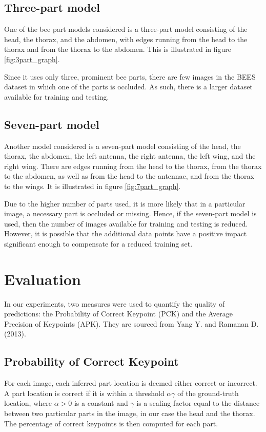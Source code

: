 \documentclass[11pt, oneside]{report}
\begin{document}
    \subsection{Three-part model}
        One of the bee part models considered is a three-part model consisting of the head, the thorax, and the abdomen, with edges running from the head to the thorax and from the thorax to the abdomen. This is illustrated in figure \ref{fig:3part_graph}.

        Since it uses only three, prominent bee parts, there are few images in the BEES dataset in which one of the parts is occluded. As such, there is a larger dataset available for training and testing.

    \subsection{Seven-part model}
        Another model considered is a seven-part model consisting of the head, the thorax, the abdomen, the left antenna, the right antenna, the left wing, and the right wing. There are edges running from the head to the thorax, from the thorax to the abdomen, as well as from the head to the antennae, and from the thorax to the wings. It is illustrated in figure \ref{fig:7part_graph}.

        Due to the higher number of parts used, it is more likely that in a particular image, a necessary part is occluded or missing. Hence, if the seven-part model is used, then the number of images available for training and testing is reduced. However, it is possible that the additional data points have a positive impact significant enough to compensate for a reduced training set.

\section{Evaluation}
    In our experiments, two measures were used to quantify the quality of predictions: the Probability of Correct Keypoint (PCK) and the Average Precision of Keypoints (APK). They are sourced from Yang Y. and Ramanan D. (2013).

    \subsection{Probability of Correct Keypoint}
        For each image, each inferred part location is deemed either correct or incorrect. A part location is correct if it is within a threshold $\alpha\gamma$ of the ground-truth location, where $\alpha>0$ is a constant and $\gamma$ is a scaling factor equal to the distance between two particular parts in the image, in our case the head and the thorax. The percentage of correct keypoints is then computed for each part.
\end{document}
